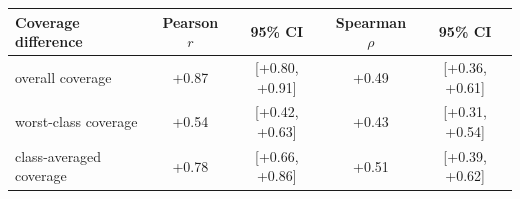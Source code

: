 \begin{tabular}{lcccc}
\toprule
Coverage difference & Pearson $r$ & 95\% CI & Spearman $\rho$ & 95\% CI \\
\midrule
overall coverage & +0.87 & [+0.80, +0.91] & +0.49 & [+0.36, +0.61] \\
worst-class coverage & +0.54 & [+0.42, +0.63] & +0.43 & [+0.31, +0.54] \\
class-averaged coverage & +0.78 & [+0.66, +0.86] & +0.51 & [+0.39, +0.62] \\
\bottomrule
\end{tabular}
